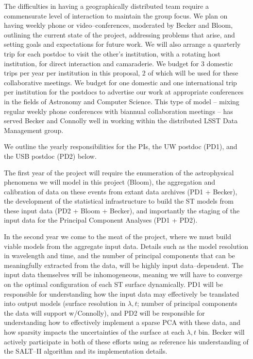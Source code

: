 The difficulties in having a geographically distributed team require a
commensurate level of interaction to maintain the group focus.  We plan on
having weekly phone or video--conferences, moderated by Becker and Bloom,
outlining the current state of the project, addressing problems that arise, and
setting goals and expectations for future work.  We will also arrange a
quarterly trip for each postdoc to visit the other's institution, with a
rotating host institution, for direct interaction and camaraderie. We budget for
3 domestic trips per year per institution in this proposal, 2 of which will be
used for these collaborative meetings.  We budget for one domestic and one
international trip per institution for the postdocs to advertise our work at
appropriate conferences in the fields of Astronomy and Computer Science. This
type of model -- mixing regular weekly phone conferences with biannual
collaboration meetings -- has served Becker and Connolly well in working within
the distributed LSST Data Management group.

We outline the yearly responsibilities for the PIs, the UW postdoc (PD1), and
the USB postdoc (PD2) below.

 \smallskip

The first year of the project will require the enumeration of the astrophysical
phenomena we will model in this project (Bloom), the aggregation and calibration
of data on these events from extant data archives (PD1 + Becker), the
development of the statistical infrastructure to build the ST models from these
input data (PD2 + Bloom + Becker), and importantly the staging of the input data
for the Principal Component Analyses (PD1 + PD2).

 \smallskip

In the second year we come to the meat of the project, where we must build
viable models from the aggregate input data.  Details such as the model
resolution in wavelength and time, and the number of principal components that
can be meaningfully extracted from the data, will be highly input
data--dependent.  The input data themselves will be inhomogeneous, meaning we
will have to converge on the optimal configuration of each ST surface
dynamically. PD1 will be responsible for understanding how the input data may
effectively be translated into output models (surface resolution in $\lambda,
t$; number of principal components the data will support w/Connolly), and PD2
will be responsible for understanding how to effectively implement a sparse PCA
with these data, and how sparsity impacts the uncertainties of the surface at
each $\lambda, t$ bin. Becker will actively participate in both of these efforts
using as reference his understanding of the SALT--II algorithm and its
implementation details.


